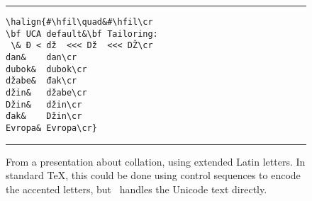 \begin{figure}[htb]
\hrule\smallskip
\small
\begin{minipage}{0.5\hsize}
\begin{verbatim}
\halign{#\hfil\quad&#\hfil\cr
\bf UCA default&\bf Tailoring:
 \& Ð < dž  <<< Dž  <<< DŽ\cr   
dan&    dan\cr
dubok&  dubok\cr
džabe&  đak\cr
džin&   džabe\cr
Džin&   džin\cr
đak&    Džin\cr
Evropa& Evropa\cr}
\end{verbatim}
\end{minipage}%
\begin{minipage}{0.5\hsize}
\end{minipage}
\smallskip\hrule
\caption{From a presentation about collation, using extended Latin letters. In standard \TeX, this could be done using control sequences to encode the accented letters, but \XeTeX\ handles the Unicode text directly.}
\label{fig-sorting-a}
\end{figure}
 